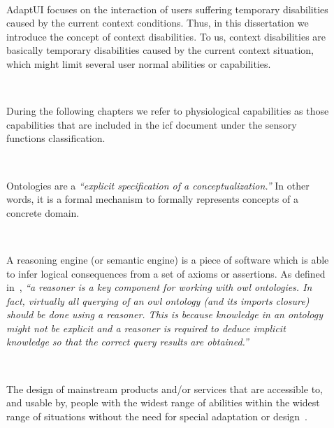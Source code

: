 \begin{description}
  \item[] \hfill \\
  \begin{mdframed}[hidealllines=true,backgroundcolor=gray!20]
  AdaptUI focuses on the interaction of users suffering temporary disabilities 
  caused by the current context conditions. Thus, in this dissertation we 
  introduce the concept of context disabilities. To us, context disabilities 
  are basically temporary disabilities caused by the current context situation, 
  which might limit several user normal abilities or capabilities.
  \end{mdframed}

  \item[] \hfill \\
  \begin{mdframed}[hidealllines=true,backgroundcolor=gray!20]
  During the following chapters we refer to physiological capabilities as those 
  capabilities that are included in the \ac{icf} document under the sensory 
  functions classification.
  \end{mdframed}
 
  \item[] \hfill \\
  \begin{mdframed}[hidealllines=true,backgroundcolor=gray!20]
  Ontologies are a \textit{``explicit specification of a conceptualization.''} 
  In other words, it is a formal mechanism to formally represents concepts of a 
  concrete domain.
  \end{mdframed}
  
  \item[] \hfill \\
  \begin{mdframed}[hidealllines=true,backgroundcolor=gray!20]
  A reasoning engine (or semantic engine) is a piece of software which is able 
  to infer logical consequences from a set of axioms or assertions. As defined
  in~\citep{owlapi_reasoners}, \textit{``a reasoner is a key component for working 
  with \ac{owl} ontologies. In fact, virtually all querying of an \ac{owl} ontology 
  (and its imports closure) should be done using a reasoner. This is because 
  knowledge in an ontology might not be explicit and a reasoner is required to 
  deduce implicit knowledge so that the correct query results are obtained.''}
  \end{mdframed}

  \item[] \hfill \\
  \begin{mdframed}[hidealllines=true,backgroundcolor=gray!20]
  The design of mainstream products and/or services that are accessible to, and
  usable by, people with the widest range of abilities within the widest range
  of situations without the need for special adaptation or design~\citep{design_2005}.
  \end{mdframed}
\end{description}